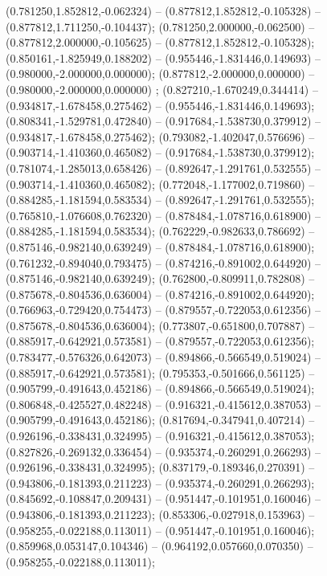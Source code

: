  (0.781250,1.852812,-0.062324) -- (0.877812,1.852812,-0.105328) -- (0.877812,1.711250,-0.104437);
 (0.781250,2.000000,-0.062500) -- (0.877812,2.000000,-0.105625) -- (0.877812,1.852812,-0.105328);
 (0.850161,-1.825949,0.188202) -- (0.955446,-1.831446,0.149693) -- (0.980000,-2.000000,0.000000);
 (0.877812,-2.000000,0.000000) -- (0.980000,-2.000000,0.000000) ;
 (0.827210,-1.670249,0.344414) -- (0.934817,-1.678458,0.275462) -- (0.955446,-1.831446,0.149693);
 (0.808341,-1.529781,0.472840) -- (0.917684,-1.538730,0.379912) -- (0.934817,-1.678458,0.275462);
 (0.793082,-1.402047,0.576696) -- (0.903714,-1.410360,0.465082) -- (0.917684,-1.538730,0.379912);
 (0.781074,-1.285013,0.658426) -- (0.892647,-1.291761,0.532555) -- (0.903714,-1.410360,0.465082);
 (0.772048,-1.177002,0.719860) -- (0.884285,-1.181594,0.583534) -- (0.892647,-1.291761,0.532555);
 (0.765810,-1.076608,0.762320) -- (0.878484,-1.078716,0.618900) -- (0.884285,-1.181594,0.583534);
 (0.762229,-0.982633,0.786692) -- (0.875146,-0.982140,0.639249) -- (0.878484,-1.078716,0.618900);
 (0.761232,-0.894040,0.793475) -- (0.874216,-0.891002,0.644920) -- (0.875146,-0.982140,0.639249);
 (0.762800,-0.809911,0.782808) -- (0.875678,-0.804536,0.636004) -- (0.874216,-0.891002,0.644920);
 (0.766963,-0.729420,0.754473) -- (0.879557,-0.722053,0.612356) -- (0.875678,-0.804536,0.636004);
 (0.773807,-0.651800,0.707887) -- (0.885917,-0.642921,0.573581) -- (0.879557,-0.722053,0.612356);
 (0.783477,-0.576326,0.642073) -- (0.894866,-0.566549,0.519024) -- (0.885917,-0.642921,0.573581);
 (0.795353,-0.501666,0.561125) -- (0.905799,-0.491643,0.452186) -- (0.894866,-0.566549,0.519024);
 (0.806848,-0.425527,0.482248) -- (0.916321,-0.415612,0.387053) -- (0.905799,-0.491643,0.452186);
 (0.817694,-0.347941,0.407214) -- (0.926196,-0.338431,0.324995) -- (0.916321,-0.415612,0.387053);
 (0.827826,-0.269132,0.336454) -- (0.935374,-0.260291,0.266293) -- (0.926196,-0.338431,0.324995);
 (0.837179,-0.189346,0.270391) -- (0.943806,-0.181393,0.211223) -- (0.935374,-0.260291,0.266293);
 (0.845692,-0.108847,0.209431) -- (0.951447,-0.101951,0.160046) -- (0.943806,-0.181393,0.211223);
 (0.853306,-0.027918,0.153963) -- (0.958255,-0.022188,0.113011) -- (0.951447,-0.101951,0.160046);
 (0.859968,0.053147,0.104346) -- (0.964192,0.057660,0.070350) -- (0.958255,-0.022188,0.113011);
